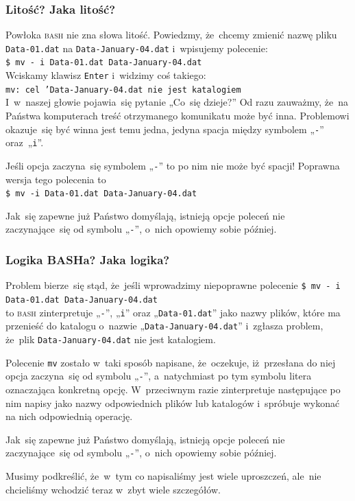 \documentclass[10pt,t]{beamer}
\begin{document}
\begin{frame}
  \frametitle{Litość? Jaka litość?}


  Powłoka \textsc{bash} nie zna słowa litość. Powiedzmy, że~chcemy
  zmienić nazwę pliku \texttt{Data-01.dat} na \texttt{Data-January-04.dat}
  i~wpisujemy polecenie: \\
  \texttt{\$ mv - i Data-01.dat Data-January-04.dat} \\
  Wciskamy klawisz \texttt{Enter} i~widzimy coś takiego: \\
  \texttt{mv: cel 'Data-January-04.dat nie jest katalogiem} \\
  I~w~naszej głowie pojawia~się pytanie „Co~się dzieje?” Od razu zauważmy,
  że~na Państwa komputerach treść otrzymanego komunikatu może być inna.
  Problemowi okazuje~się być winna jest temu jedna, jedyna spacja między
  symbolem „\texttt{-}” oraz~„\texttt{i}”.

  Jeśli opcja zaczyna~się symbolem „\texttt{-}” to po nim
  \alert{nie może być spacji}! Poprawna wersja tego polecenia to \\
  \texttt{\$ mv -i Data-01.dat Data-January-04.dat}

  Jak~się zapewne już Państwo domyślają, istnieją opcje poleceń nie
  zaczynające~się od symbolu „\texttt{-}”, o~nich opowiemy sobie później.

\end{frame}





\begin{frame}
  \frametitle{Logika BASHa? Jaka logika?}


  Problem bierze~się stąd, że~jeśli wprowadzimy niepoprawne polecenie
  \texttt{\$ mv - i Data-01.dat Data-January-04.dat} \\
  to \textsc{bash} zinterpretuje „\texttt{-}”, „\texttt{i}” oraz
  „\texttt{Data-01.dat}” jako nazwy \alert{plików}, które ma przenieść
  do katalogu o~nazwie „\texttt{Data-January-04.dat}” i~zgłasza problem,
  że~plik \texttt{Data-January-04.dat} nie jest katalogiem.

  Polecenie \texttt{mv} zostało w~taki sposób napisane, że~oczekuje,
  iż~przesłana do niej opcja zaczyna~się od symbolu „\texttt{-}”,
  a~natychmiast po tym symbolu litera oznaczająca konkretną opcję.
  W~przeciwnym razie zinterpretuje następujące po nim napisy jako nazwy
  odpowiednich plików lub katalogów i~spróbuje wykonać na nich odpowiednią
  operację.

  Jak~się zapewne już Państwo domyślają, istnieją opcje poleceń nie
  zaczynające~się od symbolu „\texttt{-}”, o~nich opowiemy sobie później.

  Musimy podkreślić, że~w~tym co napisaliśmy jest wiele uproszczeń,
  ale~nie chcieliśmy wchodzić teraz w~zbyt wiele szczegółów.

\end{frame}
\end{document}
